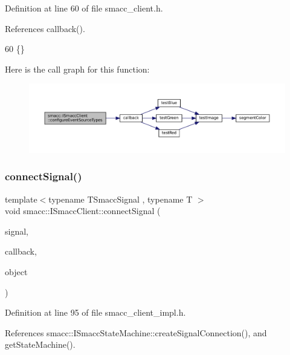 Definition at line 60 of file smacc\+\_\+client.\+h.



References callback().


\begin{DoxyCode}
60 \{\}
\end{DoxyCode}
Here is the call graph for this function\+:
\nopagebreak
\begin{figure}[H]
\begin{center}
\leavevmode
\includegraphics[width=350pt]{classsmacc_1_1ISmaccClient_a643285b93f2bd33987e0d0d1a12caf10_cgraph}
\end{center}
\end{figure}
\mbox{\label{classsmacc_1_1ISmaccClient_addce4ebcdebc5a7a3f80c0980862575d}} 
\subsubsection{\texorpdfstring{connect\+Signal()}{connectSignal()}}
{\footnotesize\ttfamily template$<$typename T\+Smacc\+Signal , typename T $>$ \\
void smacc\+::\+I\+Smacc\+Client\+::connect\+Signal (\begin{DoxyParamCaption}\item[{T\+Smacc\+Signal \&}]{signal,  }\item[{void(T\+::$\ast$)()}]{callback,  }\item[{T $\ast$}]{object }\end{DoxyParamCaption})}



Definition at line 95 of file smacc\+\_\+client\+\_\+impl.\+h.



References smacc\+::\+I\+Smacc\+State\+Machine\+::create\+Signal\+Connection(), and get\+State\+Machine().


